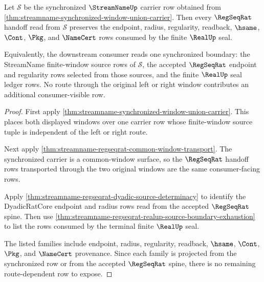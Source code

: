 \begin{theorem}
\label{thm:streamname-synchronized-window-regseqrat-seal}
Let $\mathcal S$ be the synchronized $\StreamNameUp$ carrier row obtained from
\autoref{thm:streamname-synchronized-window-union-carrier}. Then every
$\RegSeqRat$ handoff read from $\mathcal S$ preserves the endpoint, radius,
regularity, readback, $\hsame$, $\Cont$, $\Pkg$, and $\NameCert$ rows consumed
by the finite $\RealUp$ seal.

Equivalently, the downstream consumer reads one synchronized boundary: the
StreamName finite-window source rows of $\mathcal S$, the accepted
$\RegSeqRat$ endpoint and regularity rows selected from those sources, and the
finite $\RealUp$ seal ledger rows. No route through the original left or right
window contributes an additional consumer-visible row.
\end{theorem}
\begin{proof}
First apply \autoref{thm:streamname-synchronized-window-union-carrier}. This
places both displayed windows over one carrier row whose finite-window source
tuple is independent of the left or right route.

Next apply \autoref{thm:streamname-regseqrat-common-window-transport}. The
synchronized carrier is a common-window surface, so the $\RegSeqRat$ handoff
rows transported through the two original windows are the same
consumer-facing rows.

Apply \autoref{thm:streamname-regseqrat-dyadic-source-determinacy} to identify
the DyadicRatCore endpoint and radius rows read from the accepted
$\RegSeqRat$ spine. Then use
\autoref{thm:streamname-regseqrat-realup-source-boundary-exhaustion} to list
the rows consumed by the terminal finite $\RealUp$ seal.

The listed families include endpoint, radius, regularity, readback,
$\hsame$, $\Cont$, $\Pkg$, and $\NameCert$ provenance. Since each family is
projected from the synchronized row or from the accepted $\RegSeqRat$ spine,
there is no remaining route-dependent row to expose.
\end{proof}

